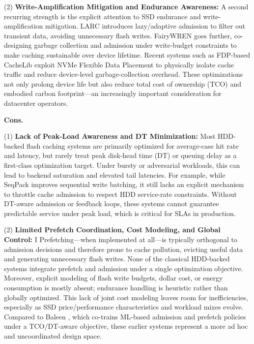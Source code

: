 (2) \textbf{Write-Amplification Mitigation and Endurance Awareness:} A second recurring strength is the explicit attention to SSD endurance and write-amplification mitigation. LARC \cite{huang2016larc} introduces lazy/adaptive admission to filter out transient data, avoiding unnecessary flash writes. FairyWREN \cite{osdi24-fairywren} goes further, co-designing garbage collection and admission under write-budget constraints to make caching sustainable over device lifetime. Recent systems such as FDP-based CacheLib \cite{allison2025fdp} exploit NVMe Flexible Data Placement to physically isolate cache traffic and reduce device-level garbage-collection overhead. These optimizations not only prolong device life but also reduce total cost of ownership (TCO) and embodied carbon footprint—an increasingly important consideration for datacenter operators.

\noindent\textbf{Cons.}


(1) \textbf{Lack of Peak-Load Awareness and DT Minimization:} Most HDD-backed flash caching systems are primarily optimized for average-case hit rate and latency, but rarely treat peak disk-head time (DT) or queuing delay as a first-class optimization target. Under bursty or adversarial workloads, this can lead to backend saturation and elevated tail latencies. For example, while SeqPack \cite{tang2023seqpack} improves sequential write batching, it still lacks an explicit mechanism to throttle cache admission to respect HDD service-rate constraints. Without DT-aware admission or feedback loops, these systems cannot guarantee predictable service under peak load, which is critical for SLAs in production. 

(2) \textbf{Limited Prefetch Coordination, Cost Modeling, and Global Control:}
I 
Prefetching—when implemented at all—is typically orthogonal to admission decisions and therefore prone to cache pollution, evicting useful data and generating unnecessary flash writes. None of the classical HDD-backed systems integrate prefetch and admission under a single optimization objective. Moreover, explicit modeling of flash write budgets, dollar cost, or energy consumption is mostly absent; endurance handling is heuristic rather than globally optimized. This lack of joint cost modeling leaves room for inefficiencies, especially as SSD price/performance characteristics and workload mixes evolve. Compared to Baleen \cite{wong2024baleen}, which co-trains ML-based admission and prefetch policies under a TCO/DT-aware objective, these earlier systems represent a more ad hoc and uncoordinated design space.

